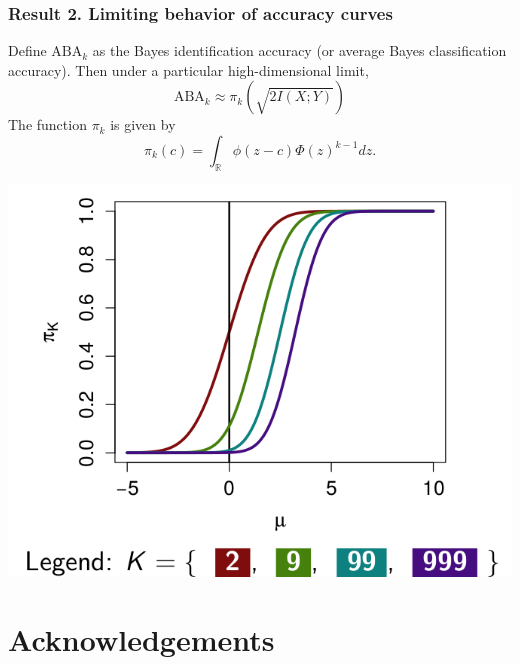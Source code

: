 \documentclass{beamer}
\begin{document}
\begin{frame}
\begin{center}
\begin{tabular}{cc}
\end{tabular}
\end{center}
\end{frame}

\begin{frame}
\frametitle{Result 2. Limiting behavior of accuracy curves} 
Define
$\text{ABA}_k$ as the Bayes identification accuracy (or average Bayes
classification accuracy).  Then under a particular high-dimensional
limit,
\begin{equation}\label{abepi}
\text{ABA}_k \approx \pi_k(\sqrt{2 I(X; Y)})
\end{equation}
The function $\pi_k$ is given by
\[
\pi_k(c) = \int_{\mathbb{R}} \phi(z - c)  \Phi(z)^{k-1} dz.
\]
\begin{center}
\includegraphics[scale = 0.2]{piK.png}
\end{center}
\end{frame}

\section*{Acknowledgements}

\begin{frame}
\sectionpage
\end{frame}
\end{document}
